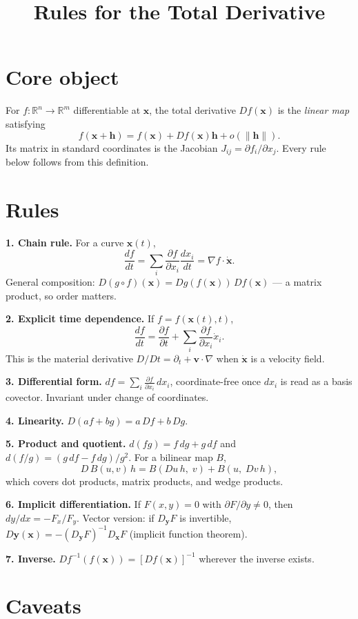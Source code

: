 \documentclass[10pt]{article}
\title{\vspace{-2em}\textbf{Rules for the Total Derivative}\vspace{-1em}}
\date{}
\newcommand{\x}{\mathbf{x}}
\newcommand{\h}{\mathbf{h}}
\newcommand{\pd}[2]{\frac{\partial #1}{\partial #2}}
\begin{document}
\maketitle

\section*{Core object}

For $f:\mathbb{R}^n\to\mathbb{R}^m$ differentiable at $\x$, the total derivative $Df(\x)$ is the
\emph{linear map} satisfying
\[
f(\x+\h) = f(\x) + Df(\x)\h + o(\|\h\|).
\]
Its matrix in standard coordinates is the Jacobian $J_{ij} = \partial f_i/\partial x_j$. Every rule
below follows from this definition.

\section*{Rules}

\textbf{1. Chain rule.} For a curve $\x(t)$,
\[
\frac{df}{dt} = \sum_i \pd{f}{x_i}\frac{dx_i}{dt} = \nabla f\cdot\dot{\x}.
\]
General composition: $D(g\circ f)(\x) = Dg(f(\x))\,Df(\x)$ --- a matrix product, so order matters.

\textbf{2. Explicit time dependence.} If $f = f(\x(t),t)$,
\[
\frac{df}{dt} = \pd{f}{t} + \sum_i \pd{f}{x_i}\dot{x}_i .
\]
This is the material derivative $D/Dt = \partial_t + \mathbf{v}\cdot\nabla$ when $\dot{\x}$ is a
velocity field.

\textbf{3. Differential form.} $df = \sum_i \pd{f}{x_i}\,dx_i$, coordinate-free once $dx_i$ is read
as a basis covector. Invariant under change of coordinates.

\textbf{4. Linearity.} $D(af+bg) = a\,Df + b\,Dg$.

\textbf{5. Product and quotient.} $d(fg) = f\,dg + g\,df$ and $d(f/g) = (g\,df - f\,dg)/g^2$.
For a bilinear map $B$,
\[
D\,B(u,v)\,h = B(Du\,h,\;v) + B(u,\;Dv\,h),
\]
which covers dot products, matrix products, and wedge products.

\textbf{6. Implicit differentiation.} If $F(x,y)=0$ with $\partial F/\partial y \neq 0$, then
$dy/dx = -F_x/F_y$. Vector version: if $D_{\mathbf{y}}F$ is invertible,
$D\mathbf{y}(\x) = -(D_{\mathbf{y}}F)^{-1}D_{\x}F$ (implicit function theorem).

\textbf{7. Inverse.} $Df^{-1}(f(\x)) = [Df(\x)]^{-1}$ wherever the inverse exists.

\section*{Caveats}
\end{document}
